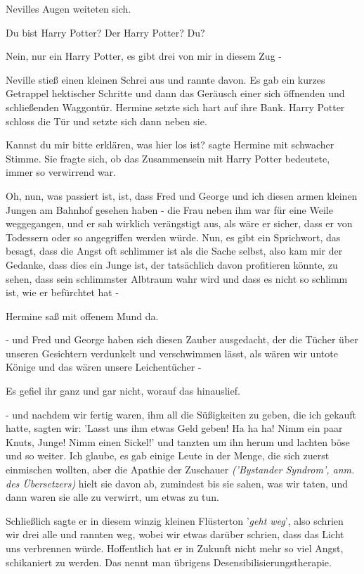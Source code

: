 Nevilles Augen weiteten sich.

\glqq Du bist Harry Potter? Der Harry Potter? Du?\grqq{}

\glqq Nein, nur ein Harry Potter, es gibt drei von mir in diesem Zug -\grqq{}

Neville stieß einen kleinen Schrei aus und rannte davon. Es gab ein kurzes
Getrappel hektischer Schritte und dann das Geräusch einer sich öffnenden und
schließenden Waggontür. Hermine setzte sich hart auf ihre Bank. Harry Potter
schloss die Tür und setzte sich dann neben sie.

\glqq Kannst du mir bitte erklären, was hier los ist?\grqq{} sagte Hermine mit
schwacher Stimme. Sie fragte sich, ob das Zusammensein mit Harry Potter
bedeutete, immer so verwirrend war.

\glqq Oh, nun, was passiert ist, ist, dass Fred und George und ich diesen armen
kleinen Jungen am Bahnhof gesehen haben - die Frau neben ihm war für eine Weile
weggegangen, und er sah wirklich verängstigt aus, als wäre er sicher, dass er
von Todessern oder so angegriffen werden würde. Nun, es gibt ein Sprichwort, das
besagt, dass die Angst oft schlimmer ist als die Sache selbst, also kam mir der
Gedanke, dass dies ein Junge ist, der tatsächlich davon profitieren könnte, zu
sehen, dass sein schlimmster Albtraum wahr wird und dass es nicht so schlimm
ist, wie er befürchtet hat -\grqq{}

Hermine saß mit offenem Mund da.

\glqq - und Fred und George haben sich diesen Zauber ausgedacht, der die Tücher
über unseren Gesichtern verdunkelt und verschwimmen lässt, als wären wir untote
Könige und das wären unsere Leichentücher -\grqq{}

Es gefiel ihr ganz und gar nicht, worauf das hinauslief.

\glqq - und nachdem wir fertig waren, ihm all die Süßigkeiten zu geben, die ich
gekauft hatte, sagten wir: 'Lasst uns ihm etwas Geld geben! Ha ha ha! Nimm ein
paar Knuts, Junge! Nimm einen Sickel!' und tanzten um ihn herum und lachten böse
und so weiter. Ich glaube, es gab einige Leute in der Menge, die sich zuerst
einmischen wollten, aber die Apathie der Zuschauer \emph{('Bystander Syndrom',
anm. des Übersetzers)} hielt sie davon ab, zumindest bis sie sahen, was wir
taten, und dann waren sie alle zu verwirrt, um etwas zu tun.

Schließlich sagte er in diesem winzig kleinen Flüsterton '\emph{geht weg}', also
schrien wir drei alle und rannten weg, wobei wir etwas darüber schrien, dass das
Licht uns verbrennen würde. Hoffentlich hat er in Zukunft nicht mehr so viel
Angst, schikaniert zu werden. Das nennt man übrigens
Desensibilisierungstherapie.\grqq{}

